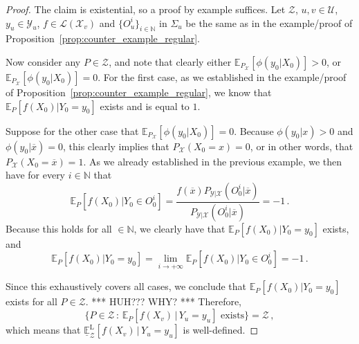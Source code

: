 \documentclass[twoside,11pt]{article}
\newcommand{\nats}{\mathbb{N}}
\newcommand{\states}{\mathcal{X}}
\newcommand{\observs}{\mathcal{Y}}
\newcommand{\gambles}{\mathcal{L}}
\begin{document}
\begin{proof}
The claim is existential, so a proof by example suffices. Let $\mathcal{Z}$, $u,v\in\mathcal{U}$, $y_u\in\observs_u$, $f\in\gambles(\states_v)$ and $\{O_u^i\}_{i\in\nats}$ in $\Sigma_u$ be the same as in the example/proof of Proposition~\ref{prop:counter_example_regular}.

Now consider any $P\in\mathcal{Z}$, and note that clearly either $\mathbb{E}_{P_\states}[\phi(y_0\vert X_0)]>0$, or $\mathbb{E}_{P_\states}[\phi(y_0\vert X_0)]=0$. For the first case, as we established in the example/proof of Proposition~\ref{prop:counter_example_regular}, we know that $\mathbb{E}_P[f(X_0)\vert Y_0=y_0]$ exists and is equal to $1$.

Suppose for the other case that $\mathbb{E}_{P_\states}[\phi(y_0\vert X_0)]=0$. Because $\phi(y_0\vert x)>0$ and $\phi(y_0\vert \overline{x})=0$, this clearly implies that $P_\states(X_0=x)=0$, or in other words, that $P_\states(X_0=\overline{x})=1$. As we already established in the previous example, we then have for every $i\in\nats$ that
\begin{equation*}
\mathbb{E}_P[f(X_0)\vert Y_0\in O_0^i] = \frac{f(\overline{x})P_{\observs\vert\states}(O_0^i\vert \overline{x})}{P_{\observs\vert\states}(O_0^i\vert \overline{x})} = -1\,.
\end{equation*}
Because this holds for all $\in\nats$, we clearly have that $\mathbb{E}_P[f(X_0)\vert Y_0 = y_0]$ exists, and
\begin{equation*}
\mathbb{E}_P[f(X_0)\vert Y_0=y_0] = \lim_{i\to+\infty} \mathbb{E}_P[f(X_0)\vert Y_0\in O_0^i] = -1\,.
\end{equation*}

Since this exhaustively covers all cases, we conclude that $\mathbb{E}_P[f(X_0)\vert Y_0=y_0]$ exists for all $P\in\mathcal{Z}$. *** HUH??? WHY? *** Therefore,
\begin{equation*}
\{P\in\mathcal{Z}\,:\,\text{$\mathbb{E}_P[f(X_v)\,\vert\,Y_u=y_u]$ exists}\} = \mathcal{Z}\,,
\end{equation*}
which means that $\underline{\mathbb{E}}_\mathcal{Z}^\mathrm{L}[f(X_v)\,\vert\, Y_u=y_u]$ is well-defined.


\end{proof}
\end{document}
